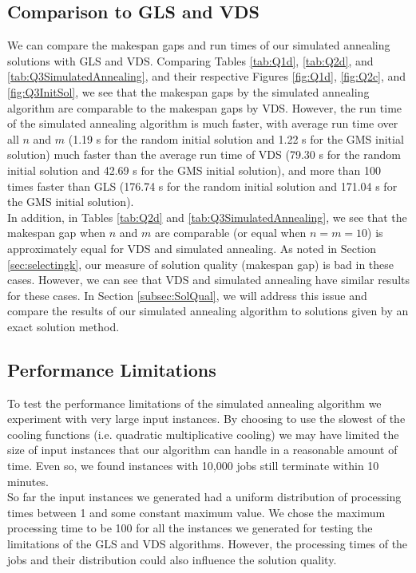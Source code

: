 \documentclass[12pt,a4paper,reqno]{article}
\begin{document}
\subsection{Comparison to GLS and VDS} \label{subsec:SimAnn_Comp}
We can compare the makespan gaps and run times of our simulated annealing solutions with GLS and VDS.
Comparing Tables \ref{tab:Q1d}, \ref{tab:Q2d}, and \ref{tab:Q3SimulatedAnnealing}, and their respective Figures \ref{fig:Q1d}, \ref{fig:Q2c}, and \ref{fig:Q3InitSol}, we see that the makespan gaps by the simulated annealing algorithm are comparable to the makespan gaps by VDS. However, the run time of the simulated annealing algorithm is much faster, with average run time over all $n$ and $m$ (1.19 s for the random initial solution and 1.22 s for the GMS initial solution) much faster than the average run time of VDS (79.30 s for the random initial solution and 42.69 s for the GMS initial solution), and more than 100 times faster than GLS (176.74 s for the random initial solution and 171.04 s for the GMS initial solution). \\

In addition, in Tables \ref{tab:Q2d} and \ref{tab:Q3SimulatedAnnealing}, we see that the makespan gap when $n$ and $m$ are comparable (or equal when $n=m=10$) is approximately equal for VDS and simulated annealing. As noted in Section \ref{sec:selectingk}, our measure of solution quality (makespan gap) is bad in these cases. However, we can see that VDS and simulated annealing have similar results for these cases. In Section \ref{subsec:SolQual}, we will address this issue and compare the results of our simulated annealing algorithm to solutions given by an exact solution method.

\subsection{Performance Limitations} \label{subsec:SimAnn_Limit}
To test the performance limitations of the simulated annealing algorithm we experiment with very large input instances. By choosing to use the slowest of the cooling functions (i.e. quadratic multiplicative cooling) we may have limited the size of input instances that our algorithm can handle in a reasonable amount of time. Even so, we found instances with 10,000 jobs still terminate within 10 minutes. \\

So far the input instances we generated had a uniform distribution of processing times between 1 and some constant maximum value. We chose the maximum processing time to be 100 for all the instances we generated for testing the limitations of the GLS and VDS algorithms. However, the processing times of the jobs and their distribution could also influence the solution quality. \\
\end{document}
